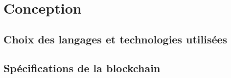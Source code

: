 \chapter{Conception}
\label{ch:conception}

\section{Choix des langages et technologies utilisées}

\section{Spécifications de la blockchain}
